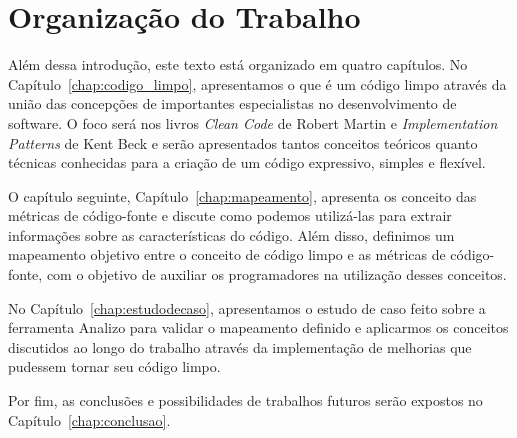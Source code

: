 \section{Organização do Trabalho}
\label{sec:organizacao_trabalho}

Além dessa introdução, este texto está organizado em quatro capítulos. No Capítulo~\ref{chap:codigo_limpo}, apresentamos o que é um código limpo 
através da união das concepções de importantes especialistas no desenvolvimento de software.
O foco será nos livros \textit{Clean Code} de Robert Martin \citep{Martin2008} e \textit{Implementation
Patterns} de Kent Beck \citep{Beck2007} e serão apresentados tantos conceitos teóricos
quanto técnicas conhecidas para a criação de um código expressivo, simples e flexível.

O capítulo seguinte, Capítulo~\ref{chap:mapeamento}, apresenta os conceito das métricas de
código-fonte e discute como podemos utilizá-las para extrair informações sobre
as características do código. Além disso, definimos um mapeamento objetivo entre
o conceito de código limpo e as métricas de código-fonte, com o objetivo de
auxiliar os programadores na utilização desses conceitos.

No Capítulo~\ref{chap:estudodecaso}, apresentamos o estudo de caso feito sobre a ferramenta Analizo para
validar o mapeamento definido e aplicarmos os conceitos discutidos ao longo do trabalho através da implementação de melhorias que pudessem
tornar seu código limpo.

Por fim, as conclusões e possibilidades de trabalhos futuros serão expostos no Capítulo~\ref{chap:conclusao}.
